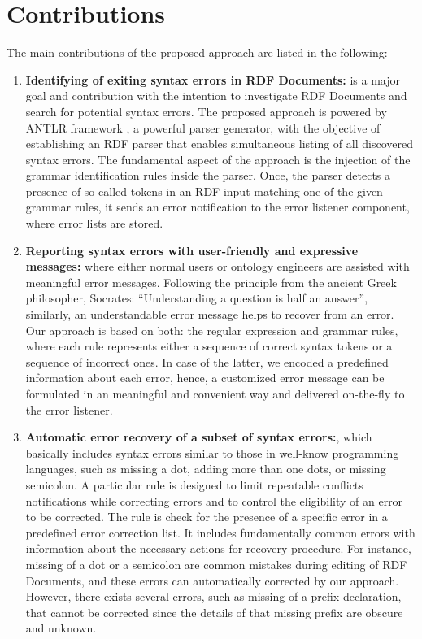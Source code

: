 

\section {Contributions}
The main contributions of the proposed approach are listed in the following:
\begin{enumerate}
	\item  {\bf Identifying of exiting syntax errors in RDF Documents:} is a major goal and contribution with the intention to investigate RDF Documents and search for potential syntax errors. 
	The proposed approach is powered by ANTLR framework \cite{ANTLR:Website:Online}, a powerful parser generator, with the objective of establishing an RDF parser that enables simultaneous listing of all discovered syntax errors. 
	The fundamental aspect of the approach is the injection of the grammar identification rules inside the parser. 
	Once, the parser detects a presence of so-called tokens in an RDF input matching one of the given grammar rules, it sends an error notification to the error listener component, where error lists are stored.
	\item {\bf Reporting syntax errors with user-friendly and expressive messages:} where either normal users or ontology engineers are assisted with meaningful error messages. 
	Following the principle from the ancient Greek philosopher, Socrates: “Understanding a question is half an answer”\cite{Socrates:quote:Online}, similarly, an understandable error message helps to recover from an error. 
	Our approach is based on both: the regular expression and grammar rules, where each rule represents either a sequence of correct syntax tokens or a sequence of incorrect ones. 
	In case of the latter, we encoded a predefined information about each error, hence, a customized error message can be formulated in an meaningful and convenient way and delivered on-the-fly to the error listener.  
	\item {\bf Automatic error recovery of a subset of syntax errors:}, which basically includes syntax errors similar to those in well-know programming languages, such as missing a dot, adding more than one dots, or missing semicolon. 
	A particular rule is designed to limit repeatable conflicts notifications while correcting errors and to control the eligibility of an error to be corrected. 
	The rule is check for the presence of a specific error in a predefined error correction list.
	It includes fundamentally common errors with information about the necessary actions for recovery procedure. 
	For instance, missing of a dot or a semicolon are common mistakes during editing of RDF Documents, and these errors can automatically corrected by our approach.
	However, there exists several errors, such as missing of a prefix declaration, that cannot be corrected since the details of that missing prefix are obscure and unknown.     
\end{enumerate}

